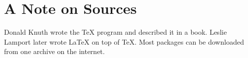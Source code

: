 \documentclass{article}
\begin{document}
\section*{A Note on Sources}
Donald Knuth wrote the TeX program and described it in a book.
Leslie Lamport later wrote LaTeX on top of TeX.
Most packages can be downloaded from one archive on the internet.

\end{document}
